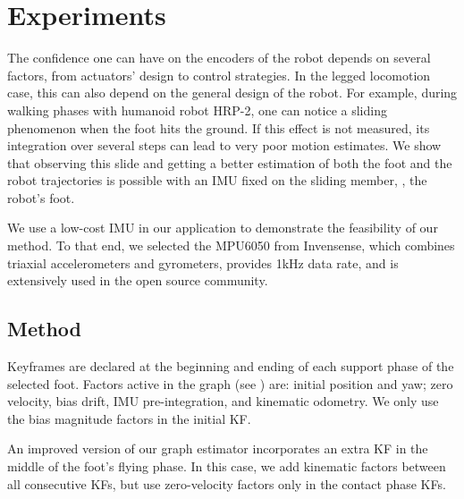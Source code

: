 
\section{Experiments} \label{sec:experiments}

The confidence one can have on the encoders of the robot depends on several factors, from actuators' design to control strategies. 
In the legged locomotion case, this can also depend on the general design of the robot.
For example, during walking phases with humanoid robot HRP-2, one can notice a sliding phenomenon when the foot hits the ground. 
If this effect is not measured, its integration over several steps can lead to very poor motion estimates. 
We show that observing this slide and getting a better estimation of both the foot and the robot trajectories is possible with an IMU fixed on the sliding member, \ie, the robot's foot.

We use a low-cost IMU in our application to demonstrate the feasibility of our method. 
To that end, we selected the MPU6050 from Invensense, which combines triaxial accelerometers and gyrometers, provides 1kHz data rate, and is extensively used in the open source community.

\subsection{Method}


Keyframes are declared at the beginning and ending of each support phase of the selected foot. Factors active in the graph (see ) are: initial position and yaw; zero velocity, bias drift, IMU pre-integration, and kinematic odometry. We only use the bias magnitude factors in the initial KF.

An improved version of our graph estimator incorporates an extra KF in the middle of the foot's flying phase. In this case, we add kinematic factors between all consecutive KFs, but use zero-velocity factors only in the contact phase KFs.

%

